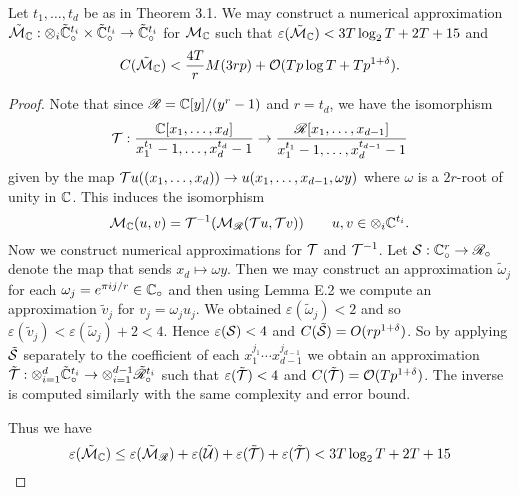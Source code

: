 
\begin{proposition}\label{prop:final}
    Let $t_1, \ldots, t_d$ be as in Theorem 3.1. We may construct a numerical approximation $\tilde{\mathcal M}_{\mathbb C}: \otimes_i \tilde{{\mathbb C}}^{t_i}_\circ \times \tilde{{\mathbb C}}^{t_i}_\circ \to \tilde{{\mathbb C}}^{t_i}_\circ$ for $\mathcal M_{\mathbb C}$ such that $\varepsilon(\tilde{\mathcal M}_{\mathbb C}) < 3 T \log_2 T + 2 T + 15$ and
    \[
        C(\tilde{\mathcal M}_{\mathbb C}) < \frac{4T}{r} M(3rp) + \mathcal O(Tp \log T + Tp^{1 + \delta}).
    \]
\end{proposition}

\begin{proof}

    Note that since $\mathscr{R} = {\mathbb C}[y]/(y^{r} - 1)$ and $r = t_d$, we have the isomorphism
    \[
        \mathcal T: \frac{{\mathbb C}[x_1, \ldots, x_d]}{x_1^{t_1} - 1, \ldots, x_d^{t_d} - 1} \to \frac{\mathscr{R}[x_1, \ldots, x_{d-1}]}{x_1^{t_1} - 1, \ldots, x_d^{t_{d-1}} - 1}
    \]
    given by the map $\mathcal Tu((x_1, \ldots, x_d)) \to u(x_1, \ldots, x_{d-1}, \omega y)$ where $\omega$ is a $2r$-root of unity in ${\mathbb C}$. This induces the isomorphism 
    \[
        \mathcal M_{\mathbb C}(u, v) = \mathcal T^{-1}(\mathcal M_{\mathscr{R}}(\mathcal Tu, \mathcal Tv)) \qquad u, v \in \otimes_i {\mathbb C}^{t_i}.
    \]
    Now we construct numerical approximations for $\mathcal T$ and $\mathcal T^{-1}$. Let $\mathcal S: {\mathbb C}^r_\circ \to \mathscr{R}_\circ$ denote the map that sends $x_d \mapsto \omega y$. Then we may construct an approximation $\tilde{\omega}_j$ for each $\omega_j = e^{\pi i j / r} \in {\mathbb C}_\circ$ and then using Lemma E.2 we compute an approximation $\tilde{v}_j$ for $v_j = \omega_j u_j$. We obtained $\varepsilon(\tilde{\omega}_j) < 2$ and so $\varepsilon(\tilde{v}_j) < \varepsilon(\tilde{\omega}_j) + 2 < 4$. Hence $\varepsilon(\mathcal S) < 4$ and $C(\tilde{\mathcal S}) = O(r p^{1 + \delta})$. So by applying $\tilde{\mathcal S}$ separately to the coefficient of each $x_1^{j_1} \cdots x_{d-1}^{j_{d-1}}$ we obtain an approximation $\tilde{\mathcal T}: \otimes_{i=1}^d \tilde{{\mathbb C}}^{t_i}_\circ \to \otimes^{d-1}_{i=1} \tilde{\mathscr{R}}_\circ^{t_i}$ such that $\varepsilon(\tilde{\mathcal T}) < 4$ and $C(\tilde{\mathcal T}) = \mathcal O(Tp^{1 + \delta})$. The inverse is computed similarly with the same complexity and error bound.

    Thus we have
    \[
        \varepsilon(\tilde{\mathcal M}_{\mathbb C}) \le \varepsilon(\tilde{\mathcal M}_{\mathscr{R}}) + \varepsilon(\tilde{\mathcal U}) + \varepsilon(\tilde{\mathcal T}) + \varepsilon(\tilde{\mathcal T}) < 3T \log_2 T + 2T + 15
    \]
\end{proof}

